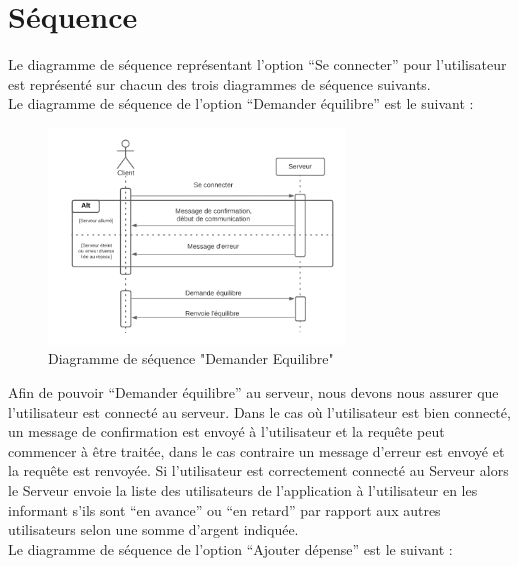 \documentclass[12,french]{report}
\begin{document}
\section{Séquence}

Le diagramme de séquence représentant l’option “Se connecter” pour l’utilisateur est représenté sur chacun des trois diagrammes de séquence suivants.\\

Le diagramme de séquence de l’option “Demander équilibre” est le suivant :\\


\begin{figure}[H]
	\center
	\includegraphics[width=0.7\textwidth]{./Images/Sequence_1}
	\caption{Diagramme de séquence "Demander Equilibre"}
\end{figure}\vspace{0.2cm}

Afin de pouvoir “Demander équilibre” au serveur, nous devons nous assurer que l’utilisateur est connecté au serveur. Dans le cas où l’utilisateur est bien connecté, un message de confirmation est envoyé à l’utilisateur et la requête peut commencer à être traitée, dans le cas contraire un message d’erreur est envoyé et la requête est renvoyée. Si l’utilisateur est correctement connecté au Serveur alors le Serveur envoie la liste des utilisateurs de l’application à l’utilisateur en les informant s’ils sont “en avance” ou “en retard” par rapport aux autres utilisateurs selon une somme d’argent indiquée.\\


Le diagramme de séquence de l’option “Ajouter dépense” est le suivant :\\
\end{document}
